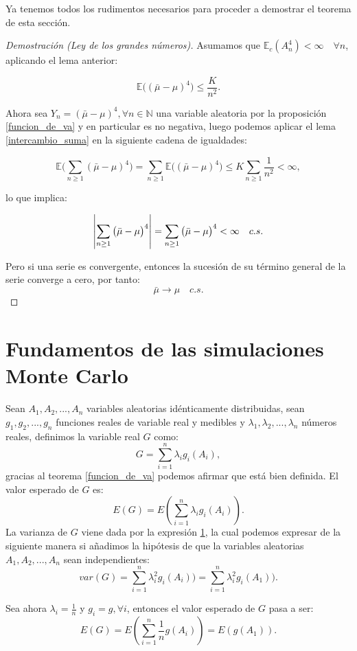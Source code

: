 \documentclass[../proyecto.tex]{memoir}
\begin{document}
Ya tenemos todos los rudimentos necesarios para proceder a demostrar el teorema de esta sección.

\begin{proof}[Demostración (Ley de los grandes números)]

Asumamos que $\mathds{E}_c( A_n^4) < \infty \quad \forall n$, aplicando el lema anterior:

$$
	\mathds{E} \big( ( \bar{ \mu } - \mu ) ^ 4 \big) \leq \frac{K}{n^{2}}.
$$

Ahora sea $Y_n = ( \bar{ \mu } - \mu ) ^ 4, \forall n \in \mathds{N}$ una variable aleatoria por la proposición \ref{funcion_de_va} y en particular es no negativa, luego podemos aplicar el lema \ref{intercambio_suma} en la siguiente cadena de igualdades:

$$
	\mathds{E} \big( \sum_{n \geq 1}( \bar{ \mu } - \mu ) ^ 4 \big) = \sum_{n \geq 1} \mathds{E} \big( ( \bar{ \mu } - \mu ) ^ 4 \big)  \leq K\sum_{n \geq 1}\frac{1}{n^{2}} < \infty,
$$

lo que implica:

$$
\abs{ \sum_{n \geq 1} \big( \bar{ \mu } - \mu \big)^ 4 } = \sum_{n \geq 1} \big( \bar{ \mu } - \mu \big)^ 4 < \infty \quad c.s. 
$$

Pero si una serie es convergente, entonces la sucesión de su término general de la serie converge a cero, por tanto:
$$
 \bar{ \mu } \to \mu \quad c.s.
$$
\end{proof}

\section{Fundamentos de las simulaciones Monte Carlo}

Sean $A_1,A_2,...,A_n$ variables aleatorias idénticamente distribuidas, sean $g_1, g_2, ..., g_n$ funciones reales de variable real y medibles y $\lambda_1, \lambda_2,..., \lambda_n$ números reales, definimos la variable real $G$ como:
$$
G = \sum_{i=1}^{n} \lambda_i g_i(A_i),
$$
gracias al teorema \ref{funcion_de_va} podemos afirmar que está bien definida. El valor esperado de $G$ es:
$$
E(G) = E(\sum_{i=1}^{n} \lambda_i g_i(A_i)).
$$
La varianza de $G$ viene dada por la expresión \ref{}, la cual podemos expresar de la siguiente manera si añadimos la hipótesis de que la variables aleatorias $A_1,A_2,...,A_n$ sean independientes:
$$
var(G) = \sum_{i=1}^{n} \lambda_i^2 g_i(A_i)) = \sum_{i=1}^{n} \lambda_i^2 g_i(A_1)).
$$

Sea ahora $\lambda_i = \frac{1}{n}$ y $g_i = g, \forall i$, entonces el valor esperado de $G$ pasa a ser:
$$
E(G) = E(\sum_{i=1}^{n} \frac{1}{n} g(A_i)) = E(g(A_1)).
$$ 
\end{document}
